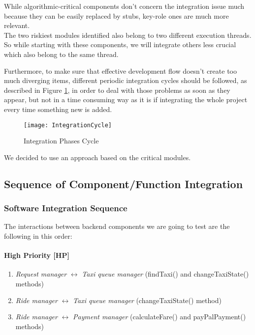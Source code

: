 While algorithmic-critical components don't concern the integration issue much because they can be easily replaced by stubs, key-role ones are much more relevant.\\  

The two riskiest modules identified also belong to two different execution threads. So while starting with these components, we will integrate others less crucial which also belong to the same thread.

Furthermore, to make sure that effective development flow doesn't create too much diverging items, different periodic integration cycles should be followed, as described in Figure \ref{fig:IntegrationCycle}, in order to deal with those problems as soon as they appear, but not in a time consuming way as it is if integrating the whole project every time something new is added.

\begin{figure}[h!]
    \centering
    \texttt{[image: IntegrationCycle]}
    \caption{Integration Phases Cycle}
    \label{fig:IntegrationCycle}
\end{figure}

We decided to use an approach based on the critical modules. 

\newpage
\subsection{Sequence of Component/Function Integration}

    \subsubsection{Software Integration Sequence}
    
    The interactions between backend components we are going to test are the following in this order:
    
    \paragraph{High Priority [HP]}
    \begin{enumerate}
        \item \textit{Request manager} $ \longleftrightarrow $ \textit{Taxi queue manager} (findTaxi() and changeTaxiState() methods)
        \item \textit{Ride manager} $ \longleftrightarrow $ \textit{Taxi queue manager} (changeTaxiState() method)
        \item \textit{Ride manager} $ \longleftrightarrow $ \textit{Payment manager} (calculateFare() and payPalPayment() methods)
    \end{enumerate}
    
